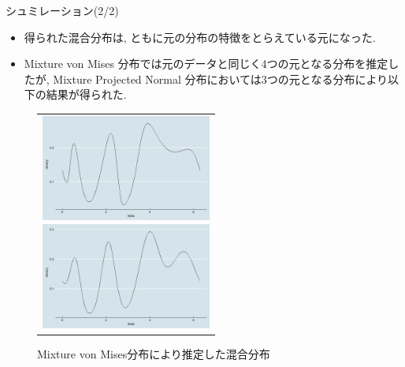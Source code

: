 \documentclass[dvipdfmx]{beamer}
\begin{document}
\begin{frame}{シュミレーション(2/2)}

\begin{itemize}
\item
得られた混合分布は, ともに元の分布の特徴をとらえている元になった.

\item
Mixture von Mises 分布では元のデータと同じく4つの元となる分布を推定したが, Mixture Projected Normal 分布においては3つの元となる分布により以下の結果が得られた.

\end{itemize}

\vspace{-0.3cm}
\begin{figure}[h]
 \begin{tabular}{c}
 \begin{minipage}{0.5\hsize}
  \begin{center}
   \includegraphics[clip,height= 35mm]{data/mix_pn.png}
  \end{center}
  \caption{Mixture Projected Normal 分布により推定した混合分布}
  \label{pnmix}
 \end{minipage}
 \begin{minipage}{0.5\hsize}
  \begin{center}
   \includegraphics[clip,height= 35mm]{data/mix_von.png}
  \end{center}
  \caption{Mixture von Mises分布により推定した混合分布}
  \label{vonmix}
 \end{minipage}
  \end{tabular}
\end{figure}

\end{frame}
\end{document}
